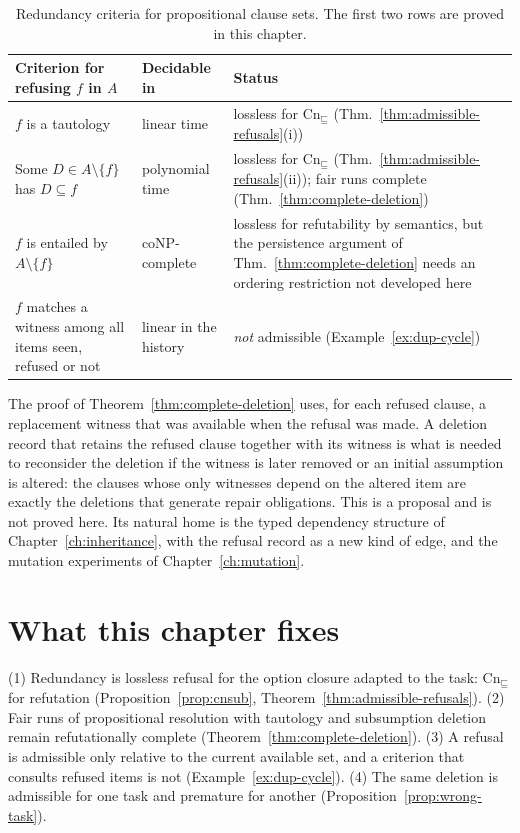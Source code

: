 \begin{table}[ht]
\centering
\small
\begin{tabular}{@{}p{4.1cm}p{3.1cm}p{5.1cm}@{}}
\toprule
Criterion for refusing $f$ in $A$ & Decidable in & Status\\
\midrule
$f$ is a tautology & linear time & lossless for $\mathrm{Cn}_{\sqsubseteq}$ (Thm.~\ref{thm:admissible-refusals}(i))\\
Some $D\in A\setminus\{f\}$ has $D\subseteq f$ & polynomial time & lossless for $\mathrm{Cn}_{\sqsubseteq}$ (Thm.~\ref{thm:admissible-refusals}(ii)); fair runs complete (Thm.~\ref{thm:complete-deletion})\\
$f$ is entailed by $A\setminus\{f\}$ & coNP-complete \cite{cook1971} & lossless for refutability by semantics, but the persistence argument of Thm.~\ref{thm:complete-deletion} needs an ordering restriction not developed here\\
$f$ matches a witness among all items seen, refused or not & linear in the history & \emph{not} admissible (Example~\ref{ex:dup-cycle})\\
\bottomrule
\end{tabular}
\caption{Redundancy criteria for propositional clause sets. The first two rows are proved in this chapter.}
\label{tab:redundancy}
\end{table}

\begin{remark}
\label{rem:deletion-records}
The proof of Theorem~\ref{thm:complete-deletion} uses, for each refused clause, a replacement witness that was available when the refusal was made. A deletion record that retains the refused clause together with its witness is what is needed to reconsider the deletion if the witness is later removed or an initial assumption is altered: the clauses whose only witnesses depend on the altered item are exactly the deletions that generate repair obligations. This is a proposal and is not proved here. Its natural home is the typed dependency structure of Chapter~\ref{ch:inheritance}, with the refusal record as a new kind of edge, and the mutation experiments of Chapter~\ref{ch:mutation}.
\end{remark}

\section{What this chapter fixes}

\begin{principal}
(1) Redundancy is lossless refusal for the option closure adapted to the task: $\mathrm{Cn}_{\sqsubseteq}$ for refutation (Proposition~\ref{prop:cnsub}, Theorem~\ref{thm:admissible-refusals}). (2) Fair runs of propositional resolution with tautology and subsumption deletion remain refutationally complete (Theorem~\ref{thm:complete-deletion}). (3) A refusal is admissible only relative to the current available set, and a criterion that consults refused items is not (Example~\ref{ex:dup-cycle}). (4) The same deletion is admissible for one task and premature for another (Proposition~\ref{prop:wrong-task}).
\end{principal}

